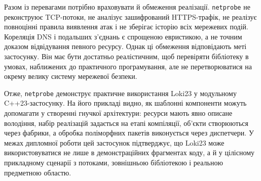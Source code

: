 Разом із перевагами потрібно враховувати й обмеження реалізації.
\texttt{netprobe} не реконструює TCP-потоки, не аналізує зашифрований
HTTPS-трафік, не реалізує повноцінні правила виявлення атак і не
зберігає історію всіх мережевих подій. Кореляція DNS і подальших
з'єднань є спрощеною евристикою, а не точним доказом відвідування
певного ресурсу. Однак ці обмеження відповідають меті застосунку. Він
має бути достатньо реалістичним, щоб перевіряти бібліотеку в умовах,
наближених до практичного програмування, але не перетворюватися на
окрему велику систему мережевої безпеки.

Отже, \texttt{netprobe} демонструє практичне використання Loki23 у
модульному C++23-застосунку. На його прикладі видно, як шаблонні
компоненти можуть допомагати у створенні гнучкої архітектури: ресурси
мають явно описане володіння, набір реалізацій задається на етапі
компіляції, об'єкти створюються через фабрики, а обробка поліморфних
пакетів виконується через диспетчери. У межах дипломної роботи цей
застосунок підтверджує, що Loki23 може використовуватися не лише в
демонстраційних фрагментах коду, а й у цілісному прикладному сценарії з
потоками, зовнішньою бібліотекою і реальною предметною областю.
